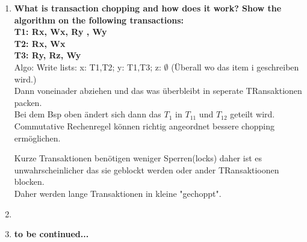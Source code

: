 \documentclass[12pt]{article}\pagestyle{myheadings}
\theoremstyle{plain}
\begin{document}
\begin{enumerate}
\item \textbf{What is transaction chopping and how does it work? Show the algorithm on the following transactions:\\ 
T1: Rx, Wx, Ry , Wy\\
T2: Rx, Wx\\
T3: Ry, Rz, Wy\\
} 
Algo:
Write lists: x: T1,T2; y: T1,T3; z: $\emptyset$ (Überall wo das item i geschreiben wird.)\\
Dann voneinader abziehen und das was überbleibt in seperate TRansaktionen packen.\\
Bei dem Bsp oben ändert sich dann das $T_1$ in $T_{11}$ und $T_{12}$ geteilt wird.\\
Commutative Rechenregel können richtig angeordnet bessere chopping ermöglichen.



Kurze Transaktionen benötigen weniger Sperren(locks) daher ist es unwahrscheinlicher das sie geblockt werden oder ander TRansaktioonen blocken.\\
Daher werden lange Transaktionen in kleine "gechoppt".\\





\item \textbf{} \\
\item \textbf{to be continued...} \\


\end{enumerate}
\end{document}
